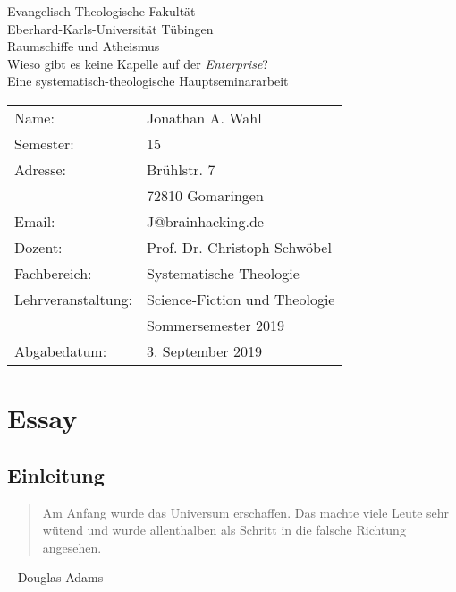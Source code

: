 \documentclass[12pt,oneside,a4paper]{scrreprt}
\author{Jonathan A. Wahl}
\begin{document}
\thispagestyle{empty}

\begin{flushleft}

{\Large Evangelisch-Theologische Fakultät\\  Eberhard-Karls-Universität Tübingen}\\[10ex]%

{\Huge Raumschiffe und Atheismus}\\[2ex]

{\Large Wieso gibt es keine Kapelle auf der \emph{Enterprise}?}\\

{\large Eine systematisch-theologische Hauptseminararbeit}\\[20ex]


\begin{tabular}{l l}
Name: & Jonathan A. Wahl\\
Semester: & 15\\
Adresse: & Brühlstr. 7\\ 
 & 72810 Gomaringen\\
Email: & J@brainhacking.de\\
Dozent: & Prof. Dr. Christoph Schwöbel\\
Fachbereich: & Systematische Theologie\\
Lehrveranstaltung: & Science-Fiction und Theologie\\ 
 & Sommersemester 2019\\
Abgabedatum: & 3. September 2019\\
\end{tabular}
\end{flushleft}


\tableofcontents
\pagebreak
 
\chapter{Essay}
\section{Einleitung}
\begin{quote}
Am Anfang wurde das Universum erschaffen. Das machte viele Leute sehr wütend und wurde allenthalben als Schritt in die falsche Richtung angesehen.
\end{quote}
\begin{flushright}-- Douglas Adams\autocite{anhalter}
\end{flushright}
\end{document}
